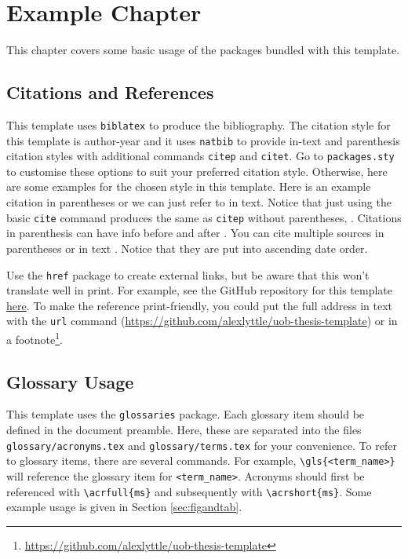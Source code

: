 \chapter{Example Chapter}

This chapter covers some basic usage of the packages bundled with this template.

\section{Citations and References}

This template uses \texttt{biblatex} to produce the bibliography. The citation style for this template is author-year and it uses \texttt{natbib} to provide in-text and parenthesis citation styles with additional commands \texttt{citep} and \texttt{citet}. Go to \texttt{packages.sty} to customise these options to suit your preferred citation style. Otherwise, here are some examples for the chosen style in this template. Here is an example citation in parentheses \citep{einstein} or we can just refer to \citet{dirac} in text. Notice that just using the basic \texttt{cite} command produces the same as \texttt{citep} without parentheses, \cite{knuth-fa}. Citations in parenthesis can have info before and after \citep[e.g.][chap. 2]{dirac}. You can cite multiple sources in parentheses \citep{einstein,knuth-fa,dirac} or in text \citet{einstein,dirac,knuth-fa}. Notice that they are put into ascending date order.

Use the \texttt{href} package to create external links, but be aware that this won't translate well in print. For example, see the GitHub repository for this template \href{https://github.com/alexlyttle/uob-thesis-template}{here}. To make the reference print-friendly, you could put the full address in text with the \texttt{url} command (\url{https://github.com/alexlyttle/uob-thesis-template}) or in a footnote\footnote{\url{https://github.com/alexlyttle/uob-thesis-template}}.

\section{Glossary Usage}

This template uses the \texttt{glossaries} package. Each glossary item should be defined in the document preamble. Here, these are separated into the files \texttt{glossary/acronyms.tex} and \texttt{glossary/terms.tex} for your convenience. To refer to glossary items, there are several commands. For example, \texttt{\textbackslash gls\{<term\_name>\}} will reference the glossary item for \texttt{<term\_name>}. Acronyms should first be referenced with \texttt{\textbackslash acrfull\{ms\}} and subsequently with \texttt{\textbackslash acrshort\{ms\}}. Some example usage is given in Section \ref{sec:figandtab}.

